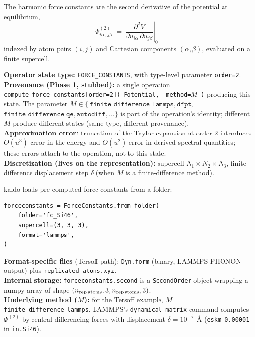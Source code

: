 \documentclass[11pt,a4paper]{article}
\begin{document}
\begin{abstractbox}
The harmonic force constants are the second derivative of the potential at equilibrium,
\begin{equation}
  \Phi^{(2)}_{i\alpha,\,j\beta} \;=\; \left.\frac{\partial^2 V}{\partial u_{i\alpha}\,\partial u_{j\beta}}\right|_{0},
\end{equation}
indexed by atom pairs $(i,j)$ and Cartesian components $(\alpha,\beta)$, evaluated on a
finite supercell.

\medskip
\textbf{Operator state type:} \texttt{FORCE\_CONSTANTS}, with type-level parameter \texttt{order=2}.\\
\textbf{Provenance (Phase 1, stubbed):} a single operation
\texttt{compute\_force\_constants[order=2](\,Potential,\, method=$M$\,)} producing
this state. The parameter $M \in \{\,\texttt{finite\_difference\_lammps},
\texttt{dfpt},\,$\\$\texttt{finite\_difference\_qe}, \texttt{autodiff}, \dots\}$ is part of the
operation's identity; different $M$ produce different states (same type, different provenance).\\
\textbf{Approximation error:} truncation of the Taylor expansion at order 2 introduces
$O(u^3)$ error in the energy and $O(u^2)$ error in derived spectral quantities; these errors
attach to the operation, not to this state.\\
\textbf{Discretization (lives on the representation):} supercell $N_1{\times}N_2{\times}N_3$,
finite-difference displacement step $\delta$ (when $M$ is a finite-difference method).
\end{abstractbox}

\begin{kaldobox}
kaldo loads pre-computed force constants from a folder:
\begin{verbatim}
forceconstants = ForceConstants.from_folder(
    folder='fc_Si46',
    supercell=(3, 3, 3),
    format='lammps',
)
\end{verbatim}
\textbf{Format-specific files} (Tersoff path): \texttt{Dyn.form} (binary, LAMMPS PHONON output)
plus \texttt{replicated\_atoms.xyz}.\\
\textbf{Internal storage:} \texttt{forceconstants.second} is a \texttt{SecondOrder} object
wrapping a numpy array of shape $(n_{\text{rep\,atoms}}, 3, n_{\text{rep\,atoms}}, 3)$.\\
\textbf{Underlying method ($M$):} for the Tersoff example, $M = $ \texttt{finite\_difference\_lammps}.
LAMMPS's \texttt{dynamical\_matrix} command computes
$\Phi^{(2)}$ by central-differencing forces with displacement $\delta = 10^{-5}$~\AA{}
(\texttt{eskm 0.00001} in \texttt{in.Si46}).
\end{kaldobox}
\end{document}
